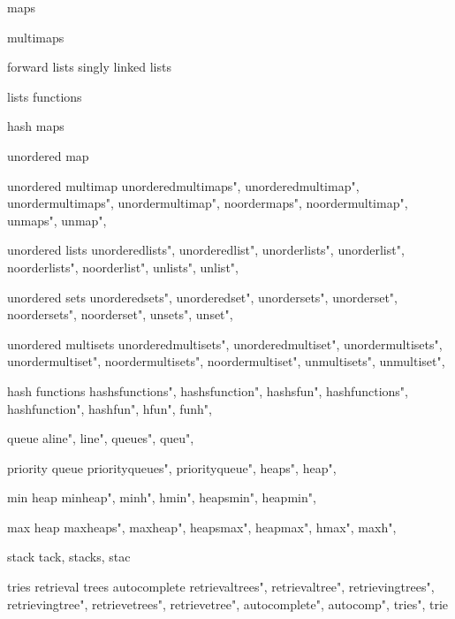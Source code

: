          maps
        
         multimaps
        
         forward lists singly linked lists
        
         lists functions 
         
         hash maps 
        
         unordered map 
         
         unordered multimap 
        unorderedmultimaps", unorderedmultimap", unordermultimaps", unordermultimap", noordermaps", noordermultimap", unmaps", unmap", 
        
         unordered lists 
        unorderedlists", unorderedlist", unorderlists", unorderlist", noorderlists", noorderlist", unlists", unlist", 
        
         unordered sets
        unorderedsets", unorderedset", unordersets", unorderset", noordersets", noorderset", unsets", unset", 
        
         unordered multisets
        unorderedmultisets", unorderedmultiset", unordermultisets", unordermultiset", noordermultisets", noordermultiset", unmultisets", unmultiset", 
        
         hash functions
        hashsfunctions",  hashsfunction",  hashsfun",  hashfunctions",  hashfunction",  hashfun",  hfun",  funh",  
        
         queue 
        aline", line", queues", queu",
        
         priority queue 
        priorityqueues",  priorityqueue",  heaps",  heap",  

         min heap 
        minheap", minh", hmin", heapsmin", heapmin",
        
         max heap
        maxheaps", maxheap", heapsmax", heapmax", hmax", maxh",
        
         stack
        tack, stacks, stac
        
         tries retrieval trees autocomplete 
        retrievaltrees",  retrievaltree",  retrievingtrees",  retrievingtree",  retrievetrees",  retrievetree",  autocomplete",  autocomp",  tries",  trie
        
